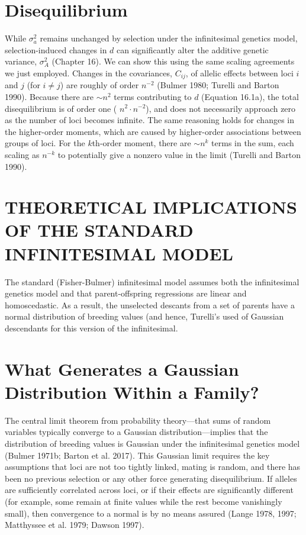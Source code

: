 \documentclass{article}
\begin{document}
\section{Disequilibrium}
While  $ \sigma_a^2 $ remains unchanged by selection under the infinitesimal genetics model, selection-induced changes in  $ d $ can significantly alter the additive genetic variance,  $ \sigma_A^2 $ (Chapter 16). We can show this using the same scaling agreements we just employed. Changes in the covariances,  $ C_{ij} $, of allelic effects between loci  $ i $ and  $ j $ (for  $ i \neq j $) are roughly of order  $ n^{-2} $ (Bulmer 1980; Turelli and Barton 1990). Because there are  $ \sim n^2 $ terms contributing to  $ d $ (Equation 16.1a), the total disequilibrium is of order one ( $ n^2 \cdot n^{-2} $), and does not necessarily approach zero as the number of loci becomes infinite. The same reasoning holds for changes in the higher-order moments, which are caused by higher-order associations between groups of loci. For the  $ k $th-order moment, there are  $ \sim n^k $ terms in the sum, each scaling as  $ n^{-k} $ to potentially give a nonzero value in the limit (Turelli and Barton 1990).

\section{THEORETICAL IMPLICATIONS OF THE STANDARD INFINITESIMAL MODEL}
The standard (Fisher-Bulmer) infinitesimal model assumes both the infinitesimal genetics model and that parent-offspring regressions are linear and homoscedastic. As a result, the unselected descants from a set of parents have a normal distribution of breeding values (and hence, Turelli's used of Gaussian descendants for this version of the infinitesimal.

\section{What Generates a Gaussian Distribution Within a Family?}
The central limit theorem from probability theory—that sums of random variables typically converge to a Gaussian distribution—implies that the distribution of breeding values is Gaussian under the infinitesimal genetics model (Bulmer 1971b; Barton et al. 2017). This Gaussian limit requires the key assumptions that loci are not too tightly linked, mating is random, and there has been no previous selection or any other force generating disequilibrium. If alleles are sufficiently correlated across loci, or if their effects are significantly different (for example, some remain at finite values while the rest become vanishingly small), then convergence to a normal is by no means assured (Lange 1978, 1997; Matthyssee et al. 1979; Dawson 1997).
\end{document}
